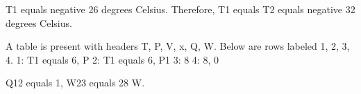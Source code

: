 T1 equals negative 26 degrees Celsius.
Therefore, T1 equals T2 equals negative 32 degrees Celsius.

A table is present with headers T, P, V, x, Q, W. Below are rows labeled 1, 2, 3, 4.
1: T1 equals 6, P
2: T1 equals 6, P1
3: 8
4: 8, 0

Q12 equals 1, W23 equals 28 W.